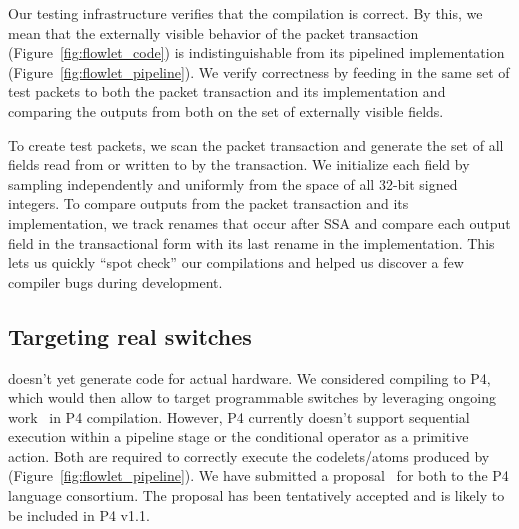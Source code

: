 Our testing infrastructure verifies that the compilation is correct. By this,
we mean that the externally visible behavior of the packet transaction
(Figure~\ref{fig:flowlet_code}) is indistinguishable from its pipelined
implementation (Figure~\ref{fig:flowlet_pipeline}). We verify correctness by
feeding in the same set of test packets to both the packet transaction and its
implementation and comparing the outputs from both on the set of externally visible fields.

To create test packets, we scan the packet transaction and generate the set of
all fields read from or written to by the transaction. We initialize each field
by sampling independently and uniformly from the space of all 32-bit signed
integers.  To compare outputs from the packet transaction and its
implementation, we track renames that occur after SSA and compare each output
field in the transactional form with its last rename in the implementation.
This lets us quickly ``spot check'' our compilations and helped us discover a
few compiler bugs during development.

\subsection{Targeting real switches}
\label{ss:real}
\pktlanguage doesn't yet generate code for actual hardware. We considered
compiling \pktlanguage to P4, which would then allow \pktlanguage to target
programmable switches by leveraging ongoing work~\cite{netronome,
xilinx,lavanya_compiler} in P4 compilation. However, P4 currently doesn't
support sequential execution within a pipeline stage or the conditional
operator as a primitive action. Both are required to correctly execute the
codelets/atoms produced by \pktlanguage (Figure~\ref{fig:flowlet_pipeline}).
We have submitted a proposal~\cite{p4-semantics} for both to the P4 language
consortium. The proposal has been tentatively accepted and is likely to be
included in P4 v1.1.

